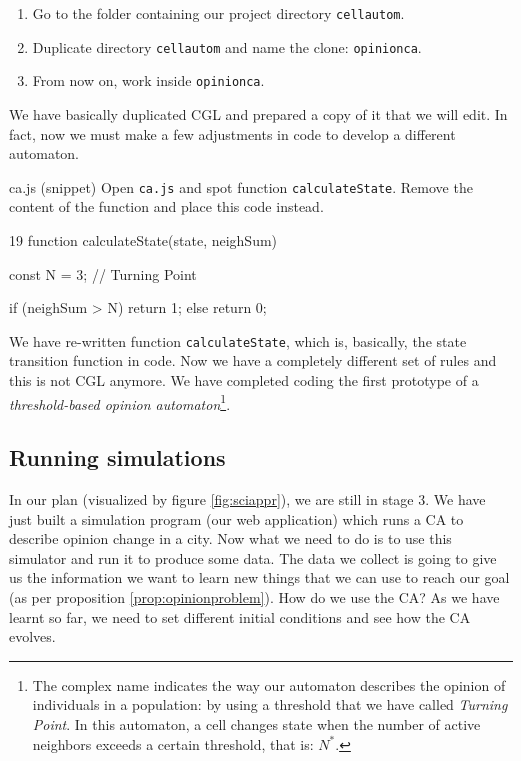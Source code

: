 \begin{enumerate}
\item Go to the folder containing our project directory \texttt{cellautom}.
\item Duplicate directory \texttt{cellautom} and name the clone: \texttt{opinionca}.
\item From now on, work inside \texttt{opinionca}.
\end{enumerate}

We have basically duplicated CGL and prepared a copy of it that we will edit. In fact, now we must
make a few adjustments in code to develop a different automaton.

\begin{programcode}{ca.js (snippet)}
Open \texttt{ca.js} and spot function \texttt{calculateState}. Remove the content of the
function and place this code instead.
\begin{codeh1}{1}{9}
function calculateState(state, neighSum) {
  const N = 3; // Turning Point

  if (neighSum > N) {
    return 1;
  } else {
    return 0;
  }
}
\end{codeh1}
\end{programcode}

We have re-written function \texttt{calculateState}, which is, basically, the state
transition function in code. Now we have a completely different set of rules and this is
not CGL anymore. We have completed coding the first prototype of a
\textit{threshold-based opinion automaton}\footnote{The complex name indicates the way
our automaton describes the opinion of individuals in a population: by using a threshold that we
have called \textit{Turning Point}. In this automaton, a cell changes state when the number
of active neighbors exceeds a certain threshold, that is: $N^\ast$.}.

\subsection{Running simulations}
In our plan (visualized by figure \ref{fig:sciappr}), we are still in stage 3. We have just built
a simulation program (our web application) which runs a CA to describe opinion change in a
city. Now what we need to do is to use this simulator and run it to produce some data. The data
we collect is going to give us the information we want to learn new things that we can use to reach
our goal (as per proposition \ref{prop:opinionproblem}). How do we use the CA? As we have learnt
so far, we need to set different initial conditions and see how the CA evolves.

